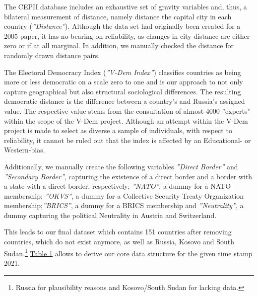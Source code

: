 \documentclass[12pt,a4paper]{article}
\begin{document}
\pagebreak
The CEPII database includes an exhaustive set of gravity variables and, thus, a bilateral measurement of distance, namely distance the capital city in each country (\textit{''Distance''}). Although the data set had originally been created for a 2005 paper, it has no bearing on reliability, as changes in city distance are either zero or if at all marginal. In addition, we manually checked the distance for randomly drawn distance pairs.

The Electoral Democracy Index (\textit{''V-Dem Index''}) classifies countries as being more or less democratic  on a scale zero to one and is our approach to not only capture geographical but also structural sociological differences. The resulting democratic distance is the difference between a country's and Russia's assigned value. The respective value stems from the consultation of almost 4000 ''experts'' within the scope of the V-Dem project. Although an attempt within the V-Dem project is made to select as diverse a sample of individuals, with respect to reliability, it cannot be ruled out that the index is affected by an Educational- or Western-bias.

Additionally, we manually create the following variables \textit{''Direct Border''} and \textit{''Secondary Border''}, capturing the existence of a direct border and a border with a state with a direct border, respectively; \textit{''NATO''}, a dummy for a NATO membership; \textit{''OKVS''}, a dummy for a Collective Security Treaty Organization membership;\textit{''BRICS''}, a dummy for a BRICS membership and \textit{''Neutrality''}, a dummy capturing the political Neutrality in Austria and Switzerland. 


This leads to our final dataset which contains 151 countries after removing countries, which do not exist anymore, as well as Russia, Kosovo and South Sudan.\footnote{Russia for plausibility reasons	and Kosovo/South Sudan for lacking data.} \hyperref[t:1]{\color{blue} Table 1} allows to derive our core data structure for the given time stamp 2021.
\end{document}
